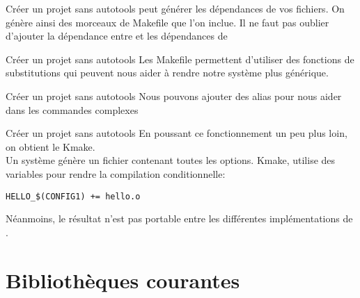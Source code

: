 \begin{frame}[fragile=singleslide]{Créer un projet sans autotools}
   peut  générer les dépendances de vos  fichiers.  On génère
  ainsi  des morceaux  de Makefile  que l'on  inclue. Il  ne  faut pas
  oublier   d'ajouter  la  dépendance   entre     et  les
  dépendances de 
  
\end{frame}

\begin{frame}[fragile=singleslide]{Créer un projet sans autotools}
  Les  Makefile permettent d'utiliser  des fonctions  de substitutions
  qui  peuvent  nous aider  à  rendre  notre  système plus  générique.
  
\end{frame}

\begin{frame}[fragile=singleslide]{Créer un projet sans autotools}
  Nous pouvons  ajouter des alias  pour nous aider dans  les commandes
  complexes
  
\end{frame}


\begin{frame}[fragile=singleslide]{Créer un projet sans autotools}
  En poussant ce fonctionnement un peu plus loin, on obtient le Kmake.\\
  Un système  génère un fichier contenant toutes  les options.  Kmake,
  utilise des variables pour rendre la compilation conditionnelle:
\begin{lstlisting}
HELLO_$(CONFIG1) += hello.o
\end{lstlisting}
  Néanmoins,  le résultat  n'est  pas portable  entre les  différentes
  implémentations de .
\end{frame}

\section{Bibliothèques courantes}

